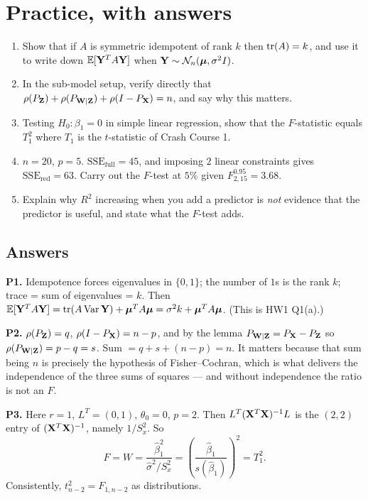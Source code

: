 \documentclass[11pt]{article}
\begin{document}
\section{Practice, with answers}

\begin{enumerate}[label=\textbf{P\arabic*.}]
\item Show that if $A$ is symmetric idempotent of rank $k$ then $\operatorname{tr}(A)=k$, and use it to
      write down $\mathbb{E}[\mathbf{Y}^TA\mathbf{Y}]$ when $\mathbf{Y}\sim\mathcal{N}_n(\boldsymbol{\mu},\sigma^2I)$.

\item In the sub-model setup, verify directly that
      $\rho(P_{\mathbf{Z}})+\rho(P_{\mathbf{W}\mid\mathbf{Z}})+\rho(I-P_{\mathbf{X}})=n$, and say why this matters.

\item Testing $H_0:\beta_1=0$ in simple linear regression, show that the $F$-statistic equals
      $T_1^2$ where $T_1$ is the $t$-statistic of Crash Course 1.

\item $n=20$, $p=5$. $\mathrm{SSE}_{\text{full}}=45$, and imposing $2$ linear constraints gives
      $\mathrm{SSE}_{\text{red}}=63$. Carry out the $F$-test at $5\%$ given
      $F^{0.95}_{2,15}=3.68$.

\item Explain why $R^2$ increasing when you add a predictor is \emph{not} evidence that the
      predictor is useful, and state what the $F$-test adds.
\end{enumerate}

\subsection*{Answers}

\noindent\textbf{P1.} Idempotence forces eigenvalues in $\{0,1\}$; the number of $1$s is the
rank $k$; trace = sum of eigenvalues = $k$. Then
$\mathbb{E}[\mathbf{Y}^TA\mathbf{Y}]=\operatorname{tr}(A\operatorname{Var}\mathbf{Y})+\boldsymbol{\mu}^TA\boldsymbol{\mu}=\sigma^2 k+\boldsymbol{\mu}^TA\boldsymbol{\mu}$. (This is HW1 Q1(a).)

\smallskip\noindent\textbf{P2.} $\rho(P_{\mathbf{Z}})=q$, $\rho(I-P_{\mathbf{X}})=n-p$, and by the lemma
$P_{\mathbf{W}\mid\mathbf{Z}}=P_{\mathbf{X}}-P_{\mathbf{Z}}$ so $\rho(P_{\mathbf{W}\mid\mathbf{Z}})=p-q=s$. Sum $=q+s+(n-p)=n$. It matters
because that sum being $n$ is precisely the hypothesis of Fisher--Cochran, which is what
delivers the independence of the three sums of squares --- and without independence the
ratio is not an $F$.

\smallskip\noindent\textbf{P3.} Here $r=1$, $L^T=(0,1)$, $\theta_0=0$, $p=2$. Then
$L^T(\mathbf{X}^T\mathbf{X})^{-1}L$ is the $(2,2)$ entry of $(\mathbf{X}^T\mathbf{X})^{-1}$, namely $1/S_x^2$. So
\[
  F=W=\frac{\hat\beta_1^2}{\hat\sigma^2/S_x^2}=\left(\frac{\hat\beta_1}{s(\hat\beta_1)}\right)^2=T_1^2 .
\]
Consistently, $t^2_{n-2}=F_{1,n-2}$ as distributions.
\end{document}
